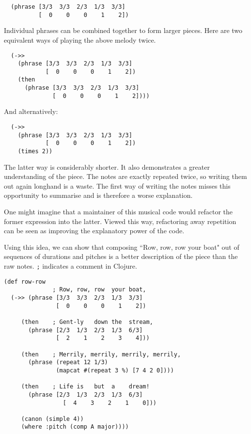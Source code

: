 \documentclass[numbers]{sigplanconf}
\begin{document}
\begin{verbatim}
  (phrase [3/3  3/3  2/3  1/3  3/3]
          [  0    0    0    1    2])
\end{verbatim}

Individual phrases can be combined together to form larger pieces. Here are two equivalent ways of playing the above melody twice.

\begin{verbatim}
  (->>
    (phrase [3/3  3/3  2/3  1/3  3/3]
            [  0    0    0    1    2])
    (then
      (phrase [3/3  3/3  2/3  1/3  3/3]
              [  0    0    0    1    2])))

\end{verbatim}

And alternatively:

\begin{verbatim}
  (->>
    (phrase [3/3  3/3  2/3  1/3  3/3]
            [  0    0    0    1    2])
    (times 2))
\end{verbatim}

The latter way is considerably shorter. It also demonstrates a greater understanding of the piece. The notes are exactly
repeated twice, so writing them out again longhand is a waste. The first way of writing the notes misses this opportunity to
summarise and is therefore a worse explanation.

One might imagine that a maintainer of this musical code would refactor the former expression into the latter. Viewed this way,
refactoring away repetition can be seen as improving the explanatory power of the code.

Using this idea, we can show that composing ``Row, row, row your boat" out of sequences of durations and pitches
is a better description of the piece than the raw notes. \verb|;| indicates a comment in Clojure.

\begin{verbatim}
(def row-row
              ; Row, row, row  your boat,
  (->> (phrase [3/3  3/3  2/3  1/3  3/3]
               [  0    0    0    1    2])

     (then    ; Gent-ly   down the  stream,
       (phrase [2/3  1/3  2/3  1/3  6/3]
               [  2    1    2    3    4]))

     (then    ; Merrily, merrily, merrily, merrily,
       (phrase (repeat 12 1/3)
               (mapcat #(repeat 3 %) [7 4 2 0])))

     (then    ; Life is   but  a    dream!
       (phrase [2/3  1/3  2/3  1/3  6/3]
                 [  4    3    2    1    0]))

     (canon (simple 4))
     (where :pitch (comp A major))))
\end{verbatim}
\end{document}
